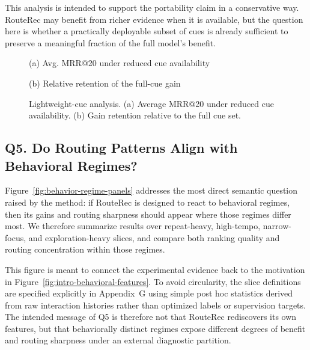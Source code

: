 \documentclass[sigconf,review,anonymous]{acmart}
\newcommand{\placeholderpanel}[1]{\fbox{\rule{0pt}{#1}\rule{0.92\linewidth}{0pt}}}
\begin{document}
This analysis is intended to support the portability claim in a conservative way. RouteRec may benefit from richer evidence when it is available, but the question here is whether a practically deployable subset of cues is already sufficient to preserve a meaningful fraction of the full model's benefit.

\begin{figure}[!t]
  \centering
  \begin{minipage}[t]{0.48\columnwidth}
    \centering
    \placeholderpanel{1.25in}

    \vspace{0.35em}
    {\footnotesize (a) Avg. MRR@20 under reduced cue availability}
  \end{minipage}\hfill
  \begin{minipage}[t]{0.48\columnwidth}
    \centering
    \placeholderpanel{1.25in}

    \vspace{0.35em}
    {\footnotesize (b) Relative retention of the full-cue gain}
  \end{minipage}
  \caption{Lightweight-cue analysis. (a) Average MRR@20 under reduced cue availability. (b) Gain retention relative to the full cue set.}
  \label{fig:cue-ablation-panels}
\end{figure}

\subsection{Q5. Do Routing Patterns Align with Behavioral Regimes?}
\label{sec:behavior-regimes}
Figure~\ref{fig:behavior-regime-panels} addresses the most direct semantic question raised by the method: if RouteRec is designed to react to behavioral regimes, then its gains and routing sharpness should appear where those regimes differ most. We therefore summarize results over repeat-heavy, high-tempo, narrow-focus, and exploration-heavy slices, and compare both ranking quality and routing concentration within those regimes.

This figure is meant to connect the experimental evidence back to the motivation in Figure~\ref{fig:intro-behavioral-features}. To avoid circularity, the slice definitions are specified explicitly in Appendix~G using simple post hoc statistics derived from raw interaction histories rather than optimized labels or supervision targets. The intended message of Q5 is therefore not that RouteRec rediscovers its own features, but that behaviorally distinct regimes expose different degrees of benefit and routing sharpness under an external diagnostic partition.
\end{document}
